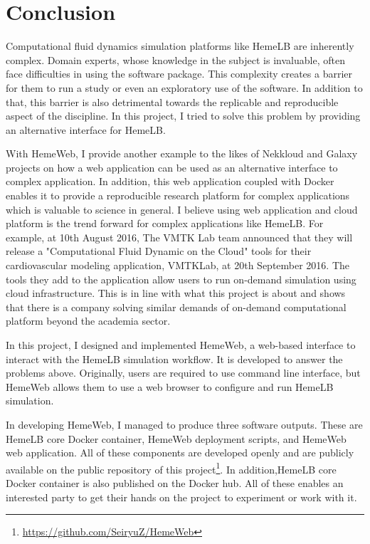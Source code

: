  

\chapter[Conclusion]{Conclusion}


Computational fluid dynamics simulation platforms like HemeLB are inherently complex. Domain experts, whose knowledge in the subject is invaluable, often face difficulties in using the software package. This complexity creates a barrier for them to run a study or even an exploratory use of the software. In addition to that, this barrier is also detrimental towards the replicable and reproducible aspect of the discipline. In this project, I tried to solve this problem by providing an alternative interface for HemeLB. 

With HemeWeb, I provide another example to the likes of Nekkloud and Galaxy projects on how a web application can be used as an alternative interface to complex application. In addition, this web application coupled with Docker enables it to provide a reproducible research platform for complex applications which is valuable to science in general. I believe using web application and cloud platform is the trend forward for complex applications like HemeLB. For example, at 10th August 2016, The VMTK Lab team announced that they will release a "Computational Fluid Dynamic on the Cloud" tools for their cardiovascular modeling application, VMTKLab, at 20th September 2016. The tools they add to the application allow users to run on-demand simulation using cloud infrastructure\citep{VMTKL63:online}. This is in line with what this project is about and shows that there is a company solving similar demands of on-demand computational platform beyond the academia sector.


In this project, I designed and implemented HemeWeb, a web-based interface to interact with the HemeLB simulation workflow. It is developed to answer the problems above. Originally, users are required to use command line interface, but HemeWeb allows them to use a web browser to configure and run HemeLB simulation. 

In developing HemeWeb, I managed to produce three software outputs. These are HemeLB core Docker container, HemeWeb deployment scripts, and HemeWeb web application. All of these components are developed openly and are publicly available on the public repository of this project\footnote{\url{https://github.com/SeiryuZ/HemeWeb}}. In addition,HemeLB core Docker container is also published on the Docker hub. All of these enables an interested party to get their hands on the project to experiment or work with it.

